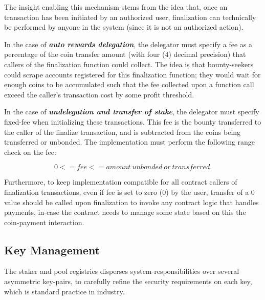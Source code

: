 The insight enabling this mechanism stems from the idea that, once an  transaction has been initiated by an authorized user, finalization can technically be performed by anyone in the system (since it is not an authorized action).

In the case of \textbf{\textit{auto rewards delegation}}, the delegator must specify a fee as a percentage of the coin transfer amount (with four (4) decimal precision) that callers of the finalization function could collect. The idea is that bounty-seekers could scrape accounts registered for this finalization function; they would wait for enough coins to be accumulated such that the fee collected upon a function call exceed the caller's transaction cost by some profit threshold. 

In the case of \textbf{\textit{undelegation and transfer of stake}}, the delegator must specify fixed-fee when initializing these transactions. This fee is the bounty transferred to the caller of the finalize transaction, and is subtracted from the coins being transferred or unbonded. The implementation must perform the following range check on the fee: 

$$0 <= fee <= amount\ unbonded\ or\ transferred.$$

Furthermore, to keep implementation compatible for all contract callers of finalization transactions, even if fee is set to zero (0) by the user, transfer of a 0 value should be called upon finalization to invoke any contract logic that handles payments, in-case the contract needs to manage some state based on this the coin-payment interaction.

\subsection{Key Management} \label{key_management}
The staker and pool registries disperses system-responsibilities over several asymmetric key-pairs, to carefully refine the security requirements on each key, which is standard practice in industry.

